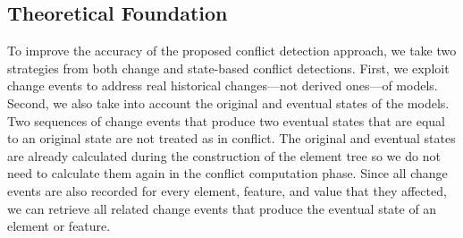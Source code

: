 \subsection{Theoretical Foundation}
\label{sec:theoretical_foundation}
To improve the accuracy of the proposed conflict detection approach, we take two strategies from both change and state-based conflict detections.
First, we exploit change events to address real historical changes—not derived ones—of models. Second, we also take into account the original and eventual states of the models. Two sequences of change events that produce two eventual states that are equal to an original state are not treated as in conflict. The original and eventual states are already calculated during the construction of the \textsf{element tree} so we do not need to calculate them again in the conflict computation phase. Since all change events are also recorded for every element, feature, and value that they affected, we can retrieve all related change events that produce the eventual state of an element or feature.

